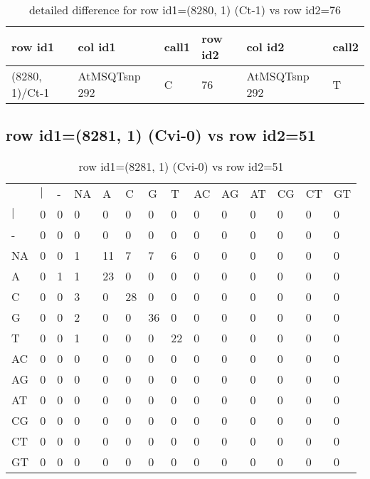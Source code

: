 \begin{center}
\begin{longtable}{|l|l|l|l|l|l|}
\caption{detailed difference for row id1=(8280, 1) (Ct-1) vs row id2=76} \label{table_dm249}\\
\hline
row id1&col id1&call1&row id2&col id2&call2\\
\hline
(8280, 1)/Ct-1&AtMSQTsnp 292&C&76&AtMSQTsnp 292&T\\
\hline
\end{longtable}
\end{center}

\subsection{row id1=(8281, 1) (Cvi-0) vs row id2=51}
\begin{center}
\begin{longtable}{|l|l|l|l|l|l|l|l|l|l|l|l|l|l|}
\caption{row id1=(8281, 1) (Cvi-0) vs row id2=51} \label{table_dm250}\\
\hline
\\
\hline
&$|$&-&NA&A&C&G&T&AC&AG&AT&CG&CT&GT\\
$|$&0&0&0&0&0&0&0&0&0&0&0&0&0\\
-&0&0&0&0&0&0&0&0&0&0&0&0&0\\
NA&0&0&1&11&7&7&6&0&0&0&0&0&0\\
A&0&1&1&23&0&0&0&0&0&0&0&0&0\\
C&0&0&3&0&28&0&0&0&0&0&0&0&0\\
G&0&0&2&0&0&36&0&0&0&0&0&0&0\\
T&0&0&1&0&0&0&22&0&0&0&0&0&0\\
AC&0&0&0&0&0&0&0&0&0&0&0&0&0\\
AG&0&0&0&0&0&0&0&0&0&0&0&0&0\\
AT&0&0&0&0&0&0&0&0&0&0&0&0&0\\
CG&0&0&0&0&0&0&0&0&0&0&0&0&0\\
CT&0&0&0&0&0&0&0&0&0&0&0&0&0\\
GT&0&0&0&0&0&0&0&0&0&0&0&0&0\\
\hline
\end{longtable}
\end{center}

